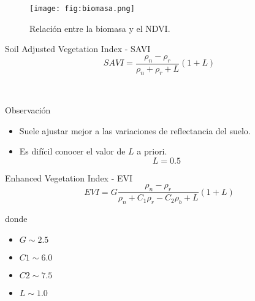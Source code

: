 \begin{frame}{}
  \begin{figure}
    \centering
    \texttt{[image: fig:biomasa.png]}
    \caption{Relación entre la biomasa y el NDVI.}
    \label{}
  \end{figure}
\end{frame}

\begin{frame}{}
    \begin{block}{Soil Adjusted Vegetation Index - SAVI}
        \begin{equation}
            SAVI = \frac{\rho_n-\rho_r}{\rho_n+\rho_r+L}(1+L)
        \end{equation}
    \end{block}\pause\
    \begin{block}{Observación}
        \begin{itemize}[<+->]
            \item Suele ajustar mejor a las variaciones de reflectancia del
                suelo.
            \item Es difícil conocer el valor de $L$ a priori. \begin{equation}
        L=0.5
    \end{equation}
        \end{itemize}
    \end{block}
\end{frame}

\begin{frame}{}
    \begin{block}{Enhanced Vegetation Index - EVI}
        \begin{equation}
            EVI = G\frac{\rho_n - \rho_r}{\rho_n+C_1\rho_r-C_2\rho_b+L}(1+L)
        \end{equation}
    \end{block}
    donde
    \begin{itemize}
        \item $G  \sim 2.5$
        \item $C1 \sim 6.0$
        \item $C2 \sim 7.5$
        \item $L  \sim 1.0$
    \end{itemize}
\end{frame}

\gracias
